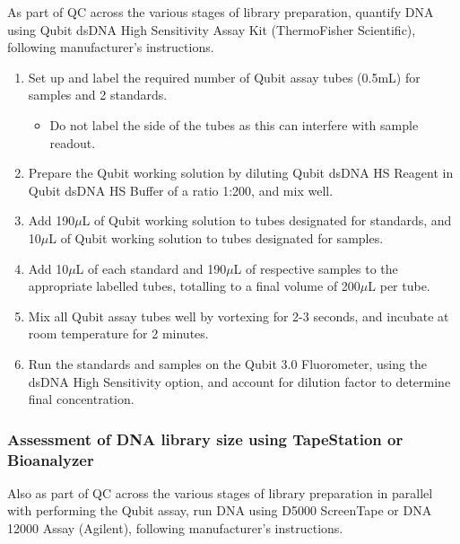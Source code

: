 \label{Isoseq_Protocol_qubit}
As part of QC across the various stages of library preparation, quantify DNA using Qubit dsDNA High Sensitivity Assay Kit (ThermoFisher Scientific), following manufacturer's instructions.  	
\begin{enumerate}
	\item Set up and label the required number of Qubit assay tubes (0.5mL) for samples and 2 standards. 
	\begin{itemize}
		\item Do not label the side of the tubes as this can interfere with sample readout. 
	\end{itemize} 
	\item Prepare the Qubit working solution by diluting Qubit dsDNA HS Reagent in Qubit dsDNA HS Buffer of a ratio 1:200, and mix well. 
	\item Add 190$\mu$L of Qubit working solution to tubes designated for standards, and 10$\mu$L of Qubit working solution to tubes designated for samples. 
	\item Add 10$\mu$L of each standard and 190$\mu$L of respective samples to the appropriate labelled tubes, totalling to a final volume of 200$\mu$L per tube.
	\item Mix all Qubit assay tubes well by vortexing for 2-3 seconds, and incubate at room temperature for 2 minutes. 
	\item Run the standards and samples on the Qubit 3.0 Fluorometer, using the dsDNA High Sensitivity option, and account for dilution factor to determine final concentration. 
\end{enumerate}

\subsubsection{Assessment of DNA library size using TapeStation or Bioanalyzer}
\label{Isoseq_Protocol_tapestation_bioanalyzer}
Also as part of QC across the various stages of library preparation in parallel with performing the Qubit assay, run DNA using D5000 ScreenTape or DNA 12000 Assay (Agilent), following manufacturer's instructions. 

